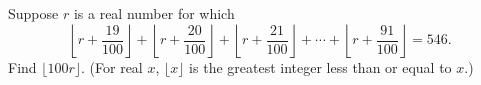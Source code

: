Suppose $r$ is a real number for which \[ \left\lfloor r + \frac{19}{100} \right\rfloor + \left\lfloor r + \frac{20}{100} \right\rfloor + \left\lfloor r + \frac{21}{100} \right\rfloor + \cdots + \left\lfloor r + \frac{91}{100} \right\rfloor = 546.  \] Find $\lfloor 100r \rfloor$. (For real $x$, $\lfloor x \rfloor$ is the greatest integer less than or equal to $x$.)